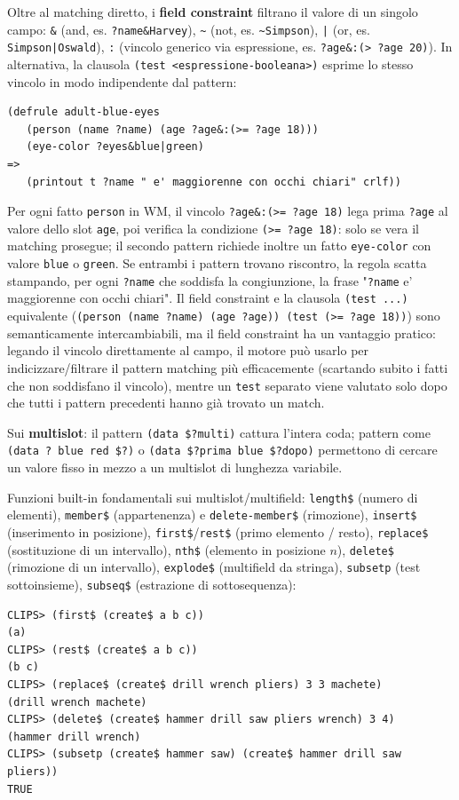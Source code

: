 \documentclass[a4paper,11pt]{article}
\begin{document}
Oltre al matching diretto, i \textbf{field constraint} filtrano il valore di un singolo campo: \texttt{\&} (and, es. \texttt{?name\&Harvey}), \texttt{\textasciitilde} (not, es. \texttt{\textasciitilde Simpson}), \texttt{|} (or, es. \texttt{Simpson|Oswald}), \texttt{:} (vincolo generico via espressione, es. \texttt{?age\&:(> ?age 20)}). In alternativa, la clausola \texttt{(test <espressione-booleana>)} esprime lo stesso vincolo in modo indipendente dal pattern:
\begin{lstlisting}
(defrule adult-blue-eyes
   (person (name ?name) (age ?age&:(>= ?age 18)))
   (eye-color ?eyes&blue|green)
=>
   (printout t ?name " e' maggiorenne con occhi chiari" crlf))
\end{lstlisting}
Per ogni fatto \texttt{person} in WM, il vincolo \texttt{?age\&:(>= ?age 18)} lega prima \texttt{?age} al valore dello slot \texttt{age}, poi verifica la condizione \texttt{(>= ?age 18)}: solo se vera il matching prosegue; il secondo pattern richiede inoltre un fatto \texttt{eye-color} con valore \texttt{blue} o \texttt{green}. Se entrambi i pattern trovano riscontro, la regola scatta stampando, per ogni \texttt{?name} che soddisfa la congiunzione, la frase "\texttt{?name} e' maggiorenne con occhi chiari". Il field constraint e la clausola \texttt{(test ...)} equivalente (\texttt{(person (name ?name) (age ?age)) (test (>= ?age 18))}) sono semanticamente intercambiabili, ma il field constraint ha un vantaggio pratico: legando il vincolo direttamente al campo, il motore può usarlo per indicizzare/filtrare il pattern matching più efficacemente (scartando subito i fatti che non soddisfano il vincolo), mentre un \texttt{test} separato viene valutato solo dopo che tutti i pattern precedenti hanno già trovato un match.

Sui \textbf{multislot}: il pattern \texttt{(data \$?multi)} cattura l'intera coda; pattern come \texttt{(data ? blue red \$?)} o \texttt{(data \$?prima blue \$?dopo)} permettono di cercare un valore fisso in mezzo a un multislot di lunghezza variabile.

Funzioni built-in fondamentali sui multislot/multifield: \texttt{length\$} (numero di elementi), \texttt{member\$} (appartenenza) e \texttt{delete-member\$} (rimozione), \texttt{insert\$} (inserimento in posizione), \texttt{first\$}/\texttt{rest\$} (primo elemento / resto), \texttt{replace\$} (sostituzione di un intervallo), \texttt{nth\$} (elemento in posizione $n$), \texttt{delete\$} (rimozione di un intervallo), \texttt{explode\$} (multifield da stringa), \texttt{subsetp} (test sottoinsieme), \texttt{subseq\$} (estrazione di sottosequenza):
\begin{lstlisting}
CLIPS> (first$ (create$ a b c))
(a)
CLIPS> (rest$ (create$ a b c))
(b c)
CLIPS> (replace$ (create$ drill wrench pliers) 3 3 machete)
(drill wrench machete)
CLIPS> (delete$ (create$ hammer drill saw pliers wrench) 3 4)
(hammer drill wrench)
CLIPS> (subsetp (create$ hammer saw) (create$ hammer drill saw pliers))
TRUE
\end{lstlisting}
\end{document}
